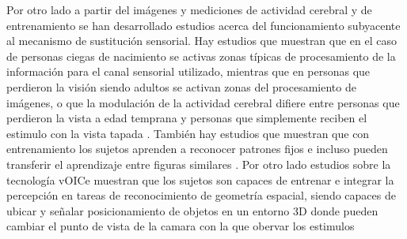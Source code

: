 \documentclass{article}
\begin{document}
    Por otro lado a partir del imágenes y mediciones de actividad cerebral y de entrenamiento se han desarrollado estudios acerca del funcionamiento subyacente al mecanismo de sustitución sensorial. Hay estudios que muestran que en el caso de personas ciegas de nacimiento se activas zonas típicas de procesamiento de la información para el canal sensorial utilizado, mientras que en personas que perdieron la visión siendo adultos se activan zonas del procesamiento de imágenes, o que la modulación de la actividad cerebral difiere entre personas que perdieron la vista a edad temprana y personas que simplemente reciben el estimulo con la vista tapada \cite{VoiceSubyacente1,VoiceSubyacente3}. También hay estudios que muestran que con entrenamiento los sujetos aprenden a reconocer patrones fijos e incluso pueden transferir el aprendizaje entre figuras similares \cite{VoiceSubyacente2}. Por otro lado estudios sobre la tecnología vOICe muestran que los sujetos son capaces de entrenar e integrar la percepción en tareas de reconocimiento de geometría espacial, siendo capaces de ubicar y señalar posicionamiento de objetos en un entorno 3D donde pueden cambiar el punto de vista de la camara con la que obervar los estimulos \cite{VoiceSubyacente4}
    
    



    
\end{document}
